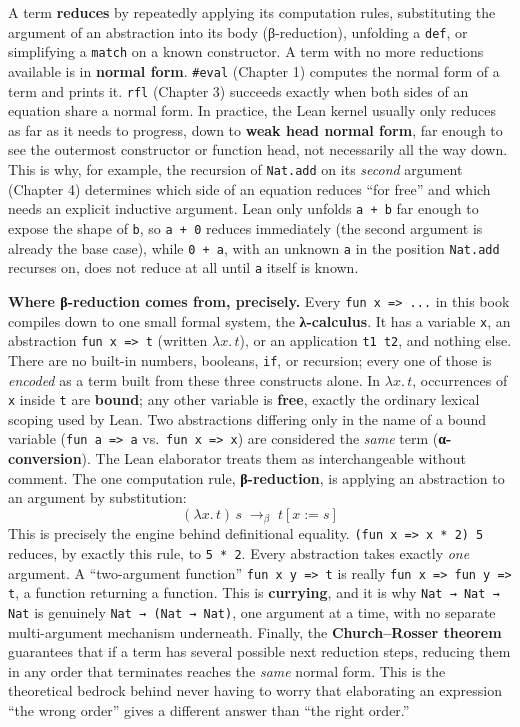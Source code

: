 A term \textbf{reduces} by repeatedly applying its computation rules, substituting the argument of an abstraction into its body (β-reduction), unfolding a \texttt{def}, or simplifying a \texttt{match} on a known constructor. A term with no more reductions available is in \textbf{normal form}. \texttt{\#eval} (Chapter 1) computes the normal form of a term and prints it. \texttt{rfl} (Chapter 3) succeeds exactly when both sides of an equation share a normal form. In practice, the Lean kernel usually only reduces as far as it needs to progress, down to \textbf{weak head normal form}, far enough to see the outermost constructor or function head, not necessarily all the way down. This is why, for example, the recursion of \texttt{Nat.add} on its \emph{second} argument (Chapter 4) determines which side of an equation reduces ``for free'' and which needs an explicit inductive argument. Lean only unfolds \texttt{a + b} far enough to expose the shape of \texttt{b}, so \texttt{a + 0} reduces immediately (the second argument is already the base case), while \texttt{0 + a}, with an unknown \texttt{a} in the position \texttt{Nat.add} recurses on, does not reduce at all until \texttt{a} itself is known.

\textbf{Where β-reduction comes from, precisely.} Every \texttt{fun x => ...} in this book compiles down to one small formal system, the \textbf{λ-calculus}. It has a variable \texttt{x}, an abstraction \texttt{fun x => t} (written \(\lambda x.\, t\)), or an application \texttt{t1 t2}, and nothing else. There are no built-in numbers, booleans, \texttt{if}, or recursion; every one of those is \emph{encoded} as a term built from these three constructs alone. In \(\lambda x.\, t\), occurrences of \texttt{x} inside \texttt{t} are \textbf{bound}; any other variable is \textbf{free}, exactly the ordinary lexical scoping used by Lean. Two abstractions differing only in the name of a bound variable (\texttt{fun a => a} vs.~\texttt{fun x => x}) are considered the \emph{same} term (\textbf{α-conversion}). The Lean elaborator treats them as interchangeable without comment. The one computation rule, \textbf{β-reduction}, is applying an abstraction to an argument by substitution: \[
(\lambda x.\, t)\, s \;\longrightarrow_\beta\; t[x := s]
\] This is precisely the engine behind definitional equality. \texttt{(fun x => x * 2) 5} reduces, by exactly this rule, to \texttt{5 * 2}. Every abstraction takes exactly \emph{one} argument. A ``two-argument function'' \texttt{fun x y => t} is really \texttt{fun x => fun y => t}, a function returning a function. This is \textbf{currying}, and it is why \texttt{Nat → Nat → Nat} is genuinely \texttt{Nat → (Nat → Nat)}, one argument at a time, with no separate multi-argument mechanism underneath. Finally, the \textbf{Church--Rosser theorem} guarantees that if a term has several possible next reduction steps, reducing them in any order that terminates reaches the \emph{same} normal form. This is the theoretical bedrock behind never having to worry that elaborating an expression ``the wrong order'' gives a different answer than ``the right order.''

